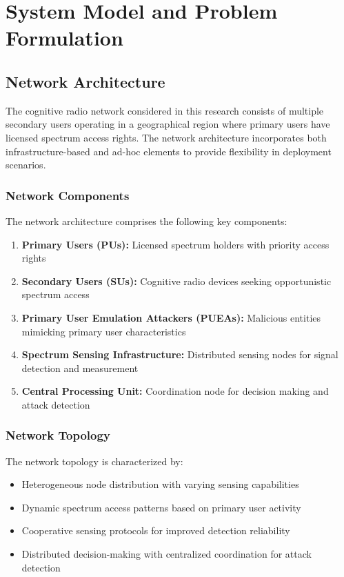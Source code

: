
\chapter{System Model and Problem Formulation}

\section{Network Architecture}
The cognitive radio network considered in this research consists of multiple secondary users operating in a geographical region where primary users have licensed spectrum access rights. The network architecture incorporates both infrastructure-based and ad-hoc elements to provide flexibility in deployment scenarios.

\subsection{Network Components}
The network architecture comprises the following key components:

\begin{enumerate}
\item \textbf{Primary Users (PUs):} Licensed spectrum holders with priority access rights
\item \textbf{Secondary Users (SUs):} Cognitive radio devices seeking opportunistic spectrum access
\item \textbf{Primary User Emulation Attackers (PUEAs):} Malicious entities mimicking primary user characteristics
\item \textbf{Spectrum Sensing Infrastructure:} Distributed sensing nodes for signal detection and measurement
\item \textbf{Central Processing Unit:} Coordination node for decision making and attack detection
\end{enumerate}

\subsection{Network Topology}
The network topology is characterized by:
\begin{itemize}
\item Heterogeneous node distribution with varying sensing capabilities
\item Dynamic spectrum access patterns based on primary user activity
\item Cooperative sensing protocols for improved detection reliability
\item Distributed decision-making with centralized coordination for attack detection
\end{itemize}

